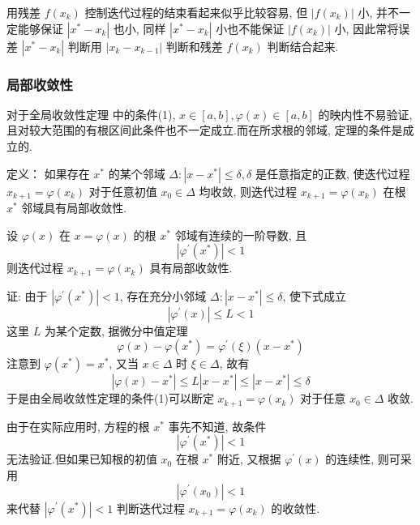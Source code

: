用残差 $ f\left(x_{k}\right) $ 控制迭代过程的结束看起来似乎比较容易, 但 $ \left|f\left(x_{k}\right)\right| $ 小, 并不一定能够保证 $ \left|x^{*}-x_{k}\right| $ 也小, 同样 $ \left|x^{*}-x_{k}\right| $ 小也不能保证 $ \left|f\left(x_{k}\right)\right| $ 小, 因此常将误差 $ \left|x^{*}-x_{k}\right| $ 判断用 $ \left|x_{k}-x_{k-1}\right| $ 判断和残差 $ f\left(x_{k}\right) $ 判断结合起来.


\subsubsection{ 局部收敛性}
对于全局收敛性定理 中的条件(1), $ x \in[a, b], \varphi(x) \in[a, b] $ 的映内性不易验证, 且对较大范围的有根区间此条件也不一定成立.而在所求根的邻域, 定理的条件是成立的.

定义： 如果存在 $ x^{*} $ 的某个邻域 $ \Delta:\left|x-x^{*}\right| \leqslant \delta, \delta $ 是任意指定的正数, 使迭代过程 $ x_{k+1}=\varphi\left(x_{k}\right) $ 对于任意初值 $ x_{0} \in \Delta $ 均收敛, 则迭代过程 $ x_{k+1}=\varphi\left(x_{k}\right) $ 在根 $ x^{*} $ 邻域具有局部收敛性.

\begin{tcolorbox}[enhanced,colback=2,colframe=1,breakable,coltitle=black,title=局部收敛定理]
 设 $ \varphi(x) $ 在 $ x=\varphi(x) $ 的根 $ x^{*} $ 邻域有连续的一阶导数, 且
$$
\left|\varphi^{\prime}\left(x^{*}\right)\right|<1
$$
则迭代过程 $ x_{k+1}=\varphi\left(x_{k}\right) $ 具有局部收敛性.
\end{tcolorbox}

证: 由于 $ \left|\varphi^{\prime}\left(x^{*}\right)\right|<1 $, 存在充分小邻域 $ \Delta:\left|x-x^{*}\right| \leqslant \delta $, 使下式成立
$$
\left|\varphi^{\prime}(x)\right| \leqslant L<1
$$
这里 $ L $ 为某个定数, 据微分中值定理
$$
\varphi(x)-\varphi\left(x^{*}\right)=\varphi^{\prime}(\xi)\left(x-x^{*}\right)
$$
注意到 $ \varphi\left(x^{*}\right)=x^{*} $, 又当 $ x \in \Delta $ 时 $ \xi \in \Delta $, 故有
$$
\left|\varphi(x)-x^{*}\right| \leqslant L\left|x-x^{*}\right| \leqslant\left|x-x^{*}\right| \leqslant \delta
$$
于是由全局收敛性定理的条件(1)可以断定 $ x_{k+1}=\varphi\left(x_{k}\right) $ 对于任意 $ x_{0} \in \Delta $ 收敛.


由于在实际应用时, 方程的根 $ x^{*} $ 事先不知道, 故条件
$$
\left|\varphi^{\prime}\left(x^{*}\right)\right|<1
$$
无法验证.但如果已知根的初值 $ x_{0} $ 在根 $ x^{*} $ 附近, 又根据 $ \varphi^{\prime}(x) $ 的连续性, 则可采用
$$
\left|\varphi^{\prime}\left(x_{0}\right)\right|<1
$$
来代替 $ \left|\varphi^{\prime}\left(x^{*}\right)\right|<1 $ 判断迭代过程 $ x_{k+1}=\varphi\left(x_{k}\right) $ 的收敛性.


